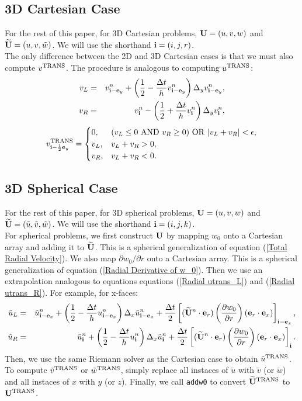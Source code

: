 \documentclass[11pt]{article}
\def\half  {\frac{1}{2}}
\def\dt    {\Delta t}
\def\trans {\rm TRANS}
\def\eb    {{\bf e}}
\def\ib    {{\bf i}}
\def\Ub    {{\bf U}}
\def\Ubt   {\widetilde{\bf U}}
\def\ut    {\tilde{u}}
\def\vt    {\tilde{v}}
\def\wt    {\tilde{w}}
\begin{document}
\subsection{3D Cartesian Case}
For the rest of this paper, for 3D Cartesian problems, $\Ub = (u,v,w)$ and $\Ubt = (u,v,\wt)$.  We will use the shorthand $\ib = (i,j,r)$.\\

The only difference between the 2D and 3D Cartesian cases is that we must also compute $v^{\trans}$.  The procedure is analogous to computing $u^{\trans}$:
\begin{eqnarray}
v_L &=& v_{\ib-\eb_y}^n + \left(\half - \frac{\dt}{h}v_{\ib-\eb_y}^n\right)\Delta_y v_{\ib-\eb_y}^n, \\
v_R &=& v_{\ib}^n - \left(\half + \frac{\dt}{h}v_{\ib}^n\right)\Delta_y v_{\ib}^n,
\end{eqnarray}
\begin{equation}
v^{\trans}_{\ib-\half\eb_y} =
\begin{cases}
0, & (v_L \le 0 ~ {\rm AND} ~ v_R \ge 0) ~ {\rm OR} ~ |v_L + v_R| < \epsilon, \\
v_L, & v_L + v_R > 0, \\
v_R, & v_L + v_R < 0. \\
\end{cases}
\end{equation}

\subsection{3D Spherical Case}
For the rest of this paper, for 3D spherical problems, $\Ub = (u,v,w)$ and $\Ubt = (\ut,\vt,\wt)$.  We will use the shorthand $\ib = (i,j,k)$.\\

For spherical problems, we first construct $\Ub$ by mapping $w_0$ onto a Cartesian array and adding it to $\Ubt$.  This is a spherical generalization of equation (\ref{Total Radial Velocity}).  We also map $\partial w_0/\partial r$ onto a Cartesian array.  This is a spherical generalization of equation (\ref{Radial Derivative of w_0}).  Then we use an extrapolation analogous to equations equations (\ref{Radial utrans_L}) and (\ref{Radial utrans_R}).  For example, for x-faces:
\begin{eqnarray}
\ut_L &=& \ut_{\ib-\eb_x}^n + \left(\half - \frac{\dt}{h}u_{\ib-\eb_x}^n\right)\Delta_x\ut_{\ib-\eb_x}^n + \frac{\dt}{2}\left[(\Ubt^n\cdot\eb_r)\left(\frac{\partial w_0}{\partial r}\right)(\eb_r\cdot\eb_x)\right]_{\ib-\eb_x}, \\
\ut_R &=& \ut_{\ib}^n + \left(\half - \frac{\dt}{h}u_{\ib}^n\right)\Delta_x\ut_{\ib}^n + \frac{\dt}{2}\left[(\Ubt^n\cdot\eb_r)\left(\frac{\partial w_0}{\partial r}\right)(\eb_r\cdot\eb_x)\right]_{\ib}.
\end{eqnarray}
Then, we use the same Riemann solver as the Cartesian case to obtain $\ut^{\trans}$.  To compute $\vt^{\trans}$ or $\wt^{\trans}$, simply replace all instaces of $\ut$ with $\vt$ (or $\wt$) and all instaces of $x$ with $y$ (or $z$).  Finally, we call {\tt addw0} to convert $\Ubt^{\trans}$ to $\Ub^{\trans}$.
\end{document}
